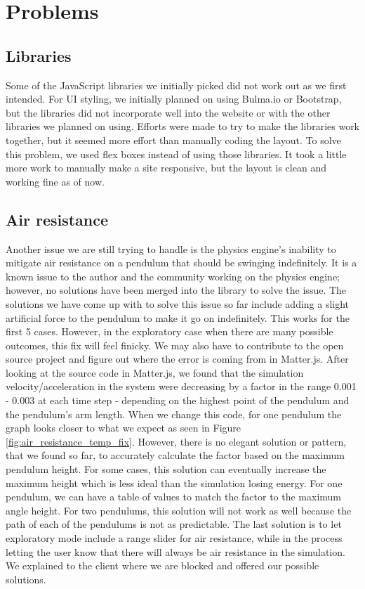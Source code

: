 \documentclass[onecolumn, draftclsnofoot,10pt, compsoc]{IEEEtran}
\begin{document}
\section{Problems}
\subsection{Libraries}
Some of the JavaScript libraries we initially picked did not work out as we first intended. 
For UI styling, we initially planned on using Bulma.io or Bootstrap, but the libraries did not incorporate well into the website or with the other libraries we planned on using. Efforts were made to try to make the libraries work together, but it seemed more effort than manually coding the layout. To solve this problem, we used flex boxes instead of using those libraries. It took a little more work to manually make a site responsive, but the layout is clean and working fine as of now. 

\subsection{Air resistance}
Another issue we are still trying to handle is the physics engine's inability to mitigate air resistance on a pendulum that should be swinging indefinitely. It is a known issue to the author and the community working on the physics engine; however, no solutions have been merged into the library to solve the issue. The solutions we have come up with to solve this issue so far include adding a slight artificial force to the pendulum to make it go on indefinitely. This works for the first 5 cases. However, in the exploratory case when there are many possible outcomes, this fix will feel finicky. 
\noindent
We may also have to contribute to the open source project and figure out where the error is coming from in Matter.js. After looking at the source code in Matter.js, we found that the simulation velocity/acceleration in the system were decreasing by a factor in the range 0.001 - 0.003 at each time step - depending on the highest point of the pendulum and the pendulum's arm length. When we change this code, for one pendulum the graph looks closer to what we expect as seen in Figure \ref{fig:air_resistance_temp_fix}. However, there is no elegant solution or pattern, that we found so far, to accurately calculate the factor based on the maximum pendulum height. For some cases, this solution can eventually increase the maximum height which is less ideal than the simulation losing energy. For one pendulum, we can have a table of values to match the factor to the maximum angle height. For two pendulums, this solution will not work as well because the path of each of the pendulums is not as predictable. The last solution is to let exploratory mode include a range slider for air resistance, while in the process letting the user know that there will always be air resistance in the simulation. We explained to the client where we are blocked and offered our possible solutions. 
\end{document}
